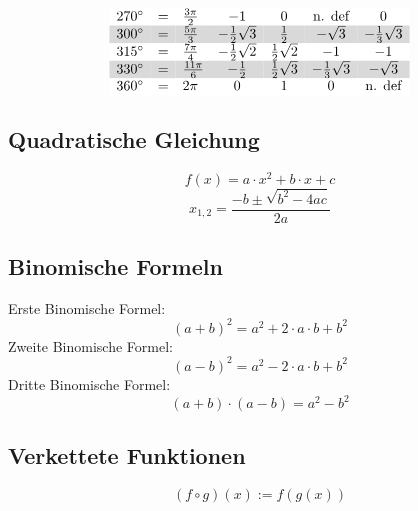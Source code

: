 \[{\begin{array}{rclcccc}
\rowcolor{white} 270^\circ&=&\frac{3\pi}{2}   &                     -1&                      0&          \text{n. def}&                      0\\
\rowcolor{lgray} 300^\circ&=&\frac{5\pi}{3}   &   -\frac{1}{2}\sqrt{3}&            \frac{1}{2}&              -\sqrt{3}&   -\frac{1}{3}\sqrt{3}\\
\rowcolor{white} 315^\circ&=&\frac{7\pi}{4}   &   -\frac{1}{2}\sqrt{2}&    \frac{1}{2}\sqrt{2}&                     -1&                     -1\\
\rowcolor{lgray} 330^\circ&=&\frac{11\pi}{6}  &           -\frac{1}{2}&    \frac{1}{2}\sqrt{3}&   -\frac{1}{3}\sqrt{3}&              -\sqrt{3}\\
\rowcolor{white} 360^\circ&=&2 \pi            &                      0&                      1&                      0&          \text{n. def}\\
\end{array}} \]

\newpage
\subsection{Quadratische Gleichung}
\[ \boxed{f(x) = a \cdot x^2 + b \cdot x + c} \]
\[ \boxed{x_{1,2}=\frac{-b\pm\sqrt{b^2-4ac}}{2a}} \]

\subsection{Binomische Formeln}
Erste Binomische Formel: 
\[ \boxed{(a + b)^2 = a^2 + 2 \cdot a \cdot b + b^2} \]Zweite Binomische Formel: 
\[ \boxed{(a - b)^2 = a^2 - 2 \cdot a \cdot b + b^2} \]Dritte Binomische Formel: 
\[ \boxed{(a + b) \cdot (a - b) = a^2 - b^2} \]

\subsection{Verkettete Funktionen}
\[ \boxed{(f \circ g)(x) := f(g(x))} \]

